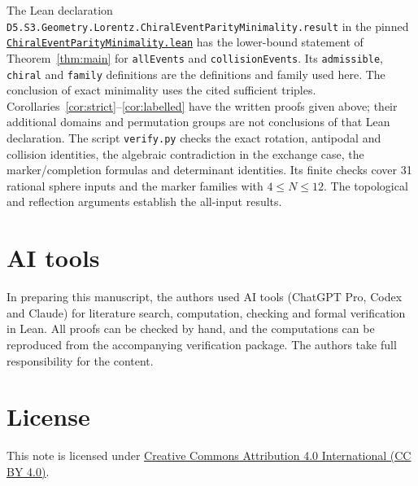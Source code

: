 \documentclass[11pt,a4paper]{article}
\begin{document}
The Lean declaration
\nolinkurl{D5.S3.Geometry.Lorentz.ChiralEventParityMinimality.result}
in the pinned
\href{https://github.com/the-omega-institute/trureturing/blob/50f2a97bb5e704842f2c32c6095f68a0dc62c779/D5/S3/Geometry/Lorentz/ChiralEventParityMinimality.lean}{\texttt{ChiralEventParityMinimality.lean}}
has the lower-bound statement of Theorem~\ref{thm:main} for
\texttt{allEvents} and \texttt{collisionEvents}.
Its \texttt{admissible}, \texttt{chiral} and \texttt{family}
definitions are the definitions and family used here.
The conclusion of exact minimality uses the cited sufficient triples.
Corollaries~\ref{cor:strict}--\ref{cor:labelled} have the written proofs
given above; their additional domains and permutation groups are not
conclusions of that Lean declaration. The script \texttt{verify.py}
checks the exact rotation, antipodal and collision identities, the
algebraic contradiction in the exchange case, the marker/completion
formulas and determinant identities. Its finite checks cover 31 rational
sphere inputs and the marker families with $4\leq N\leq12$.
The topological and reflection arguments establish the all-input results.

\clearpage
\section*{AI tools}
In preparing this manuscript, the authors used AI tools (ChatGPT Pro, Codex
and Claude) for literature search, computation, checking and formal
verification in Lean. All proofs can be checked by hand, and the
computations can be reproduced from the accompanying verification package.
The authors take full responsibility for the content.

\section*{License}
This note is licensed under
\href{https://creativecommons.org/licenses/by/4.0/}{Creative Commons
Attribution 4.0 International (CC BY 4.0)}.
\end{document}
